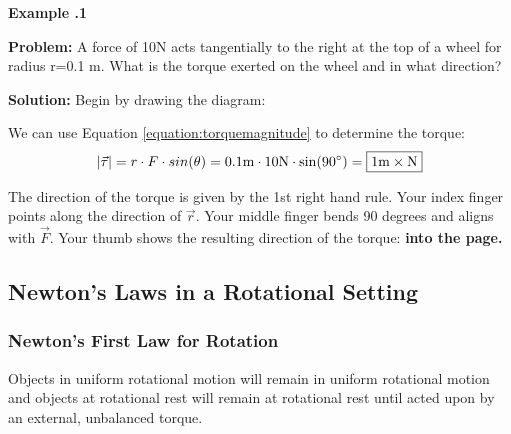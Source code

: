 	\begin{mdframed}[backgroundcolor=blue!10!white]
		\begin{center}
			
			
			\textbf{Example \thesection.1}	
		\end{center}
		\vspace{0.1in}
		\textbf{Problem:} A force of 10N acts tangentially to the right at the top of a wheel for radius r=0.1 m.  What is the torque exerted on the wheel and in what direction? 
		
		\vspace{0.1in}
		
		\textbf{Solution:} 
		Begin by drawing the diagram:
		\vspace{0.1in}
		
		\vspace{0.1in}
		
		We can use Equation \ref{equation:torquemagnitude} to determine the torque:
		\begin{equation*}
			|\vec{\tau}| = r \cdot F \cdot sin (\theta) = 0.1 \si{m} \cdot 10 \si{N} \cdot \sin( 90 \degree) = \boxed{1 \si{m \times N}}
		\end{equation*}
		
		The direction of the torque is given by the 1st right hand rule.  Your index finger points along the direction of $\vec{r}$.  Your middle finger bends 90 degrees and aligns with $\vec F$.  Your thumb shows the resulting direction of the torque: \textbf{into the page.}
		
	\end{mdframed}
	
	
	
	
	
	
	
	\subsection{Newton's Laws in a Rotational Setting}
	
	\subsubsection{Newton's First Law for Rotation}
	Objects in uniform rotational motion will remain in uniform rotational motion and objects at rotational rest will remain at rotational rest until acted upon by an external, unbalanced torque.  
	
